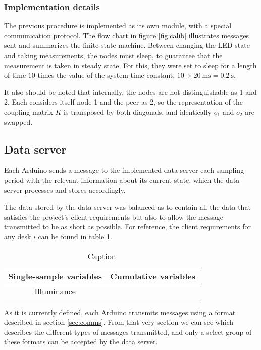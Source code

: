 \documentclass[english,fira]{ist-report}
\begin{document}
\subsubsection{Implementation details}

The previous procedure is implemented as its own module, with a special communication protocol. The flow chart in figure \ref{fig:calib} illustrates messages sent and summarizes the finite-state machine.
Between changing the LED state and taking measurements, the nodes must sleep, to guarantee that the measurement is taken in steady state. For this, they were set to sleep for a length of time $10$ times the value of the system time constant, $\SI{10}{} \times \SI{20}{\milli \second} = \SI{0.2}{\second}$. 

It also should be noted that internally, the nodes are not distinguishable as 1 and 2. Each considers itself node 1 and the peer as 2, so the representation of the coupling matrix $K$ is transposed by both diagonals, and identically $o_1$ and $o_2$ are swapped.

\subsection{Data server}

Each Arduino sends a message to the implemented data server each sampling period with the relevant information about its current state, which the data server processes and stores accordingly.

The data stored by the data server was balanced as to contain all the data that satisfies the project's client requirements but also to allow the message transmitted to be as short as possible. For reference, the client requirements for any desk $i$ can be found in table \ref{tab:client}.
\begin{table}[ht]
    \centering
    \begin{tabular}{c c}\toprule
        \textbf{Single-sample variables}        & \textbf{Cumulative variables} \\
        \midrule
        Illuminance             & \\
        
        \bottomrule
    \end{tabular}
    \caption{Caption}
    \label{tab:client}
\end{table}

As it is currently defined, each Arduino transmits messages using a format described in section \ref{sec:comms}. From that very section we can see  which describes the different types of messages transmitted, and only a select group of these formats can be accepted by the data server.
\end{document}
